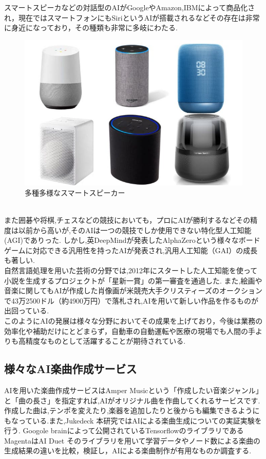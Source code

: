 スマートスピーカなどの対話型のAIがGoogleやAmazon,IBMによって商品化され，現在ではスマートフォンにもSiriというAIが搭載されるなどその存在は非常に身近になっており，その種類も非常に多岐にわたる.
\begin{figure}[!ht]
    \begin{screen}
    \begin{center}
        \includegraphics[scale=0.6, clip]{./img/smartspeaker_list.jpg}
        \caption{多種多様なスマートスピーカー}
        \label{fig:多種多様なスマートスピーカー}
    \end{center}
\end{screen}
\end{figure}\\
また囲碁や将棋,チェスなどの競技においても，プロにAIが勝利するなどその精度は以前から高いが,そのAIは一つの競技でしか使用できない特化型人工知能(AGI)でありった.
しかし,英DeepMindが発表したAlphaZeroという様々なボードゲームに対応できる汎用性を持ったAIが発表され,汎用人工知能（GAI）の成長も著しい.\\
自然言語処理を用いた芸術の分野では,2012年にスタートした人工知能を使って小説を生成するプロジェクトが「星新一賞」の第一審査を通過した.\cite{webpage2}
また,絵画や音楽に関してもAIが作成した肖像画が米競売大手クリスティーズのオークションで43万2500ドル（約4900万円）で落札され,AIを用いて新しい作品を作るものが出回っている.\cite{webpage3}\\
このようにAIの発展は様々な分野においてその成果を上げており，今後は業務の効率化や補助だけにとどまらず，自動車の自動運転や医療の現場でも人間の手よりも高精度なものとして活躍することが期待されている.
\subsection{様々なAI楽曲作成サービス}
AIを用いた楽曲作成サービスはAmper Musicという「作成したい音楽ジャンル」と「曲の長さ」を指定すれば,AIがオリジナル曲を作曲してくれるサービスです. 作成した曲は,テンポを変えたり,楽器を追加したりと後からも編集できるようにもなっている.また,Jukedeck
本研究ではAIによる楽曲生成についての実証実験を行う.
Googole brainによって公開されているTensorflowのライブラリであるMagentaはAI Duet
そのライブラリを用いて学習データやノード数による楽曲の生成結果の違いを比較，検証し，AIによる楽曲制作が有用なものか調査する.\\
